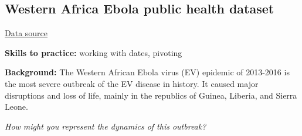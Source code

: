 \documentclass[
  letterpaper,
  DIV=11,
  numbers=noendperiod]{scrreprt}
\begin{document}
\subsection{Western Africa Ebola public health
dataset}\label{western-africa-ebola-public-health-dataset}

\href{https://www.kaggle.com/datasets/imdevskp/ebola-outbreak-20142016-complete-dataset}{Data
source}

\textbf{Skills to practice:} working with dates, pivoting

\textbf{Background:} The Western African Ebola virus (EV) epidemic of
2013-2016 is the most severe outbreak of the EV disease in history. It
caused major disruptions and loss of life, mainly in the republics of
Guinea, Liberia, and Sierra Leone.

\emph{How might you represent the dynamics of this outbreak?}
\end{document}
